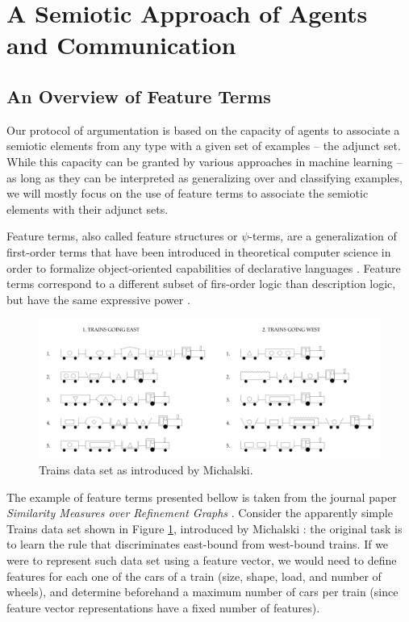 \section{A Semiotic Approach of Agents and Communication}

\subsection{An Overview of Feature Terms}\label{sec:FT}

Our protocol of argumentation is based on the capacity of agents to associate a semiotic elements from any type with a given set of examples -- the adjunct set. While this capacity can be granted by various approaches in machine learning -- as long as they can be interpreted as generalizing over and classifying examples, we will mostly focus on the use of feature terms to associate the semiotic elements with their adjunct sets.

Feature terms, also called feature structures or $\psi$-terms, are a generalization of first-order terms that have been introduced in theoretical computer science in order to formalize object-oriented capabilities of declarative languages \cite{}. Feature terms correspond to a different subset of firs-order logic than description logic, but have the same expressive power \cite{}.

\begin{figure}\label{fig:TrainGraphic}
\centering
\includegraphics[width=\textwidth]{figs/trains}
\caption{Trains data set as introduced by Michalski.}
\end{figure}

The example of feature terms presented bellow is taken from the journal paper \textit{Similarity Measures over Refinement Graphs}  \cite{}. Consider the apparently simple Trains data set shown in Figure \ref{fig:TrainGraphic}, introduced by Michalski \cite{}: the original task is to learn the rule that discriminates east-bound from west-bound trains. If we were to represent such data set using a feature vector, we would need to define features for each one of the cars of a train (size, shape, load, and number of wheels), and determine beforehand a maximum number of cars per train (since feature vector representations have a fixed number of features).

